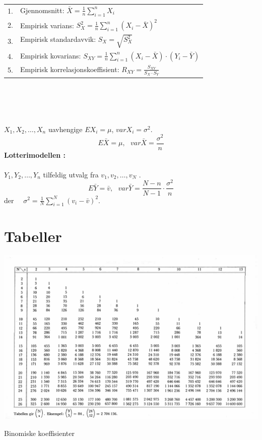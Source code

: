 \newpage
{}\\ \\
\begin{tabular}{ll}
1.& Gjennomsnitt: $\bar{X} = \frac{1}{n} \sum_{i=1}^{n}X_{i} $\\[0.1cm]
2.& Empirisk varians: $S_X^2 = \frac{1}{n}\sum_{i=1}^{n}(X_{i}-\bar{X})^{2}$\\[0.1cm]
3.& Empirisk standardavvik: $S_X=\sqrt{S_X^2}$\\[0.1cm]
4.& Empirisk kovarians: $S_{XY} =\frac{1}{n} \sum_{i=1}^{n}(X_{i}-\bar{X})\cdot(Y_{i}-\bar{Y}) $\\[0.1cm]
5.& Empirisk korrelasjonskoeffisient: $R_{XY}=\frac{S_{XY}}{S_{X} \cdot S_{Y}}$
\end{tabular}\\ \\
\\ \\
 $X_1,X_2,\ldots ,X_n$ uavhengige $EX_i=\mu$, $varX_i={\sigma}^2$.
 \[E\bar{X}=\mu, \mbox{\ \ \ }var\bar{X}=\frac{{\sigma}^2}{n}\]
{\bf Lotterimodellen :}\\ \\
 $Y_1,Y_2,\ldots ,Y_n$ tilfeldig utvalg fra $v_1,v_2,\ldots ,v_N$ .
\[ E\bar{Y}=\bar{v}, \mbox{\ \ \ } 
                  var\bar{Y}=\frac{N-n}{N-1}\cdot \frac{{\sigma}^2}{n}\]
der \ \ ${\sigma}^2=\frac{1}{N}\sum_{i=1}^N {(v_i-\bar{v})}^2.$

\addtolength{\baselineskip}{-0.1\baselineskip}

\chapter{Tabeller}
\label{app:fordelngstabeller}

\begin{table}[H]
\centering
  \includegraphics[scale=0.8]{figurer/Tabell_1_Binomiske_koeffisienter.pdf}
 \caption{Binomiske koeffisienter}
 \label{tab:Binomiske_koeffisienter} %
\end{table}


